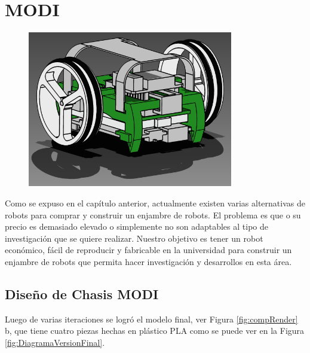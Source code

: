 
\chapter{MODI} %

\label{Chapter5} %


\begin{figure}[htbp]
	\centering
		\includegraphics[width=0.8\textwidth]{./Figures/MODI/render.png}
	\label{fig:MODI}
\end{figure}

Como se expuso en el capítulo anterior, actualmente existen varias alternativas de robots para comprar y construir un enjambre de robots. El problema es que o su precio es demasiado elevado o simplemente no son adaptables al tipo de investigación que se quiere realizar. Nuestro objetivo es tener un robot económico, fácil de reproducir y fabricable en la universidad para construir un enjambre de robots que permita hacer investigación y desarrollos en esta área.



\section{Diseño de Chasis MODI}
Luego de varias iteraciones se logró el modelo final, ver Figura \ref{fig:compRender} b, que tiene cuatro piezas hechas en plástico PLA como se puede ver en la Figura \ref{fig:DiagramaVersionFinal}. 

